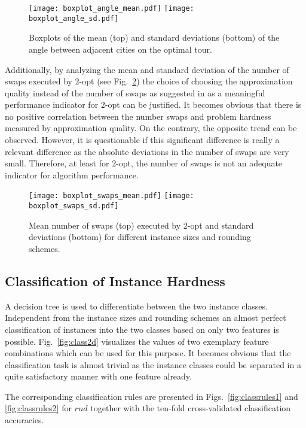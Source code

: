 \documentclass{article}
\begin{document}
\begin{figure}
  \centering
  \texttt{[image: boxplot\_angle\_mean.pdf]}
  \texttt{[image: boxplot\_angle\_sd.pdf]}
  \caption{Boxplots of the mean (top) and standard deviations (bottom)
    of the angle between adjacent cities on the optimal tour.}
  \label{fig:anglestour}
\end{figure}

Additionally, by analyzing the mean and standard deviation of the
number of swaps executed by $2$-opt (see Fig.~\ref{fig:swaps}) the
choice of choosing the approximation quality instead of the number of
swaps as suggested in \cite{SMHL10} as a meaningful performance
indicator for $2$-opt can be justified. It becomes obvious that there
is no positive correlation between the number swaps and problem
hardness measured by approximation quality. On the contrary, the
opposite trend can be observed. However, it is questionable if this
significant difference is really a relevant difference as the absolute
deviations in the number of swaps are very small. Therefore, at least
for $2$-opt, the number of swaps is not an adequate indicator for
algorithm performance.

\begin{figure}
  \centering
  \texttt{[image: boxplot\_swaps\_mean.pdf]}
  \texttt{[image: boxplot\_swaps\_sd.pdf]}
  \caption{Mean number of swaps (top) executed by $2$-opt and standard
    deviations (bottom) for different instance sizes and rounding
    schemes.}\label{fig:swaps}
\end{figure}

\subsection{Classification of Instance Hardness}
\label{sec:class}

A decision tree \cite{Breiman1984} is used to differentiate between
the two instance classes. Independent from the instance sizes and
rounding schemes an almost perfect classification of instances into
the two classes based on only two features is
possible. Fig.~\ref{fig:class2d} visualizes the values of two
exemplary feature combinations which can be used for this purpose. It
becomes obvious that the classification task is almost trivial as the
instance classes could be separated in a quite satisfactory manner
with one feature already.

The corresponding classification rules are presented in
Figs.~\ref{fig:classrules1} and \ref{fig:classrules2} for $rnd$ together with the ten-fold cross-validated classification accuracies.
\end{document}
